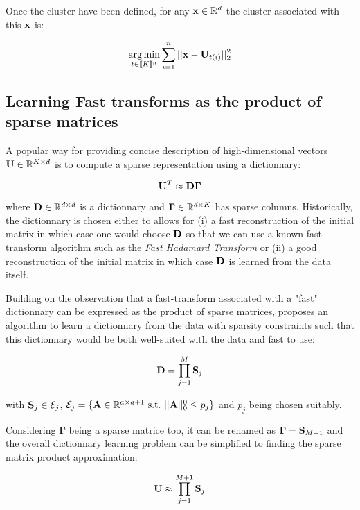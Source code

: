 \documentclass{article}
\def\rmGamma{{\mathbf{\Gamma}}}
\begin{document}
Once the cluster have been defined, for any ${\mathbf{x}} \in \mathbb{R}^d$ the cluster associated with this ${\mathbf{x}}$ is:

\begin{equation}
\operatorname*{arg\,min}_{t \in [\![K]\!]^n} \sum_{i=1}^{n} {||{\mathbf{x}} - {\mathbf{U}}_{t(i)}||_2^2}
\end{equation}


\subsection{Learning Fast transforms as the product of sparse matrices}

A popular way for providing concise description of high-dimensional vectors ${\mathbf{U}} \in \mathbb{R}^{K \times d}$ is to compute a sparse representation using a dictionnary:

\begin{equation}
\rmU^T \approx \rmD\rmGamma
\end{equation}

where ${\mathbf{D}} \in \mathbb{R}^{d \times d}$ is a dictionnary and $\rmGamma \in \R^{d \times K}$ has sparse columns. Historically, the dictionnary is chosen either to allows for (i) a fast reconstruction of the initial matrix in which case one would choose ${\mathbf{D}}$ so that we can use a known fast-transform algorithm such as the \textit{Fast Hadamard Transform} or (ii) a good reconstruction of the initial matrix in which case ${\mathbf{D}}$ is learned from the data itself.

Building on the observation that a fast-transform associated with a "fast" dictionnary can be expressed as the product of sparse matrices, \cite{magoarou} proposes an algorithm to learn a dictionnary from the data with sparsity constraints such that this dictionnary would be both well-suited with the data and fast to use:

\begin{equation}
{\mathbf{D}} = \prod_{j=1}^{M}{\mathbf{S}}_j
\end{equation}

with ${\mathbf{S}}_j \in \mathcal{E}_j$, $\mathcal{E}_j = \lbrace {\mathbf{A}} \in \mathbb{R}^{a \times a+1}~\text{s.t.}~||{\mathbf{A}}||_0^0 \leq p_j \rbrace$ and $p_j$ being chosen suitably.

Considering $\rmGamma$ being a sparse matrice too, it can be renamed as $\rmGamma = \rmS_{M+1}$ and the overall dictionnary learning problem can be simplified to finding the sparse matrix product approximation:

\begin{equation}
{\mathbf{U}} \approx \prod_{j=1}^{M+1}{\mathbf{S}}_j
\end{equation}
\end{document}
